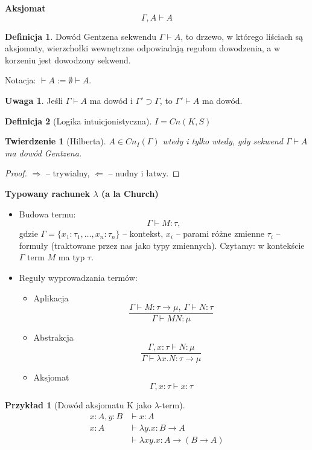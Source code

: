 \documentclass[10pt,a4paper]{article}
\theoremstyle{plain}
\newtheorem{theorem}{Twierdzenie}
\theoremstyle{definition}
\newtheorem*{definition}{Definicja}
\newtheorem*{example}{Przykład}
\newtheorem*{remark}{Uwaga}
\newcommand{\impl}{\rightarrow}
\newcommand{\header}[1]{\noindent\textbf{#1}}
\begin{document}
\header{Aksjomat}
$$\Gamma, A \vdash A$$

\begin{definition}
Dowód Gentzena sekwendu $\Gamma \vdash A$, to drzewo, w którego liściach są
aksjomaty, wierzchołki wewnętrzne odpowiadają regułom dowodzenia, a w korzeniu
jest dowodzony sekwend.
\end{definition}

\noindent Notacja: $\vdash A := \emptyset \vdash A$.

\begin{remark}
Jeśli $\Gamma \vdash A$ ma dowód i $\Gamma' \supset \Gamma$, to
$\Gamma' \vdash A$ ma dowód.
\end{remark}


\begin{definition}[Logika intuicjonistyczna]
$I = Cn(K, S)$
\end{definition}

\begin{theorem}[Hilberta]
$A \in Cn_I(\Gamma)$ wtedy i tylko wtedy, gdy sekwend $\Gamma \vdash A$ ma
dowód Gentzena.
\end{theorem}

\begin{proof}
$\Rightarrow$ -- trywialny, $\Leftarrow$ -- nudny i łatwy.
\end{proof}

\header{Typowany rachunek $\lambda$ (a la Church)}
\begin{itemize}
  \item Budowa termu:
    $$\Gamma \vdash M:\tau,$$
    gdzie $\Gamma = \{x_1:\tau_1, \ldots, x_n:\tau_n\}$ -- kontekst,
    $x_i$ -- parami różne zmienne
    $\tau_i$ -- formuły (traktowane przez nas jako typy zmiennych).
    Czytamy: w kontekście $\Gamma$ term $M$ ma typ $\tau$.
  \item Reguły wyprowadzania termów:
    \begin{itemize}
      \item Aplikacja
        $$\frac{
          \Gamma \vdash M : \tau \impl \mu, \ \Gamma \vdash N : \tau
        }{
          \Gamma \vdash MN : \mu
        }$$
      \item Abstrakcja
        $$\frac{
          \Gamma, x:\tau \vdash N : \mu
        }{
          \Gamma \vdash \lambda x . N : \tau \impl \mu
        }$$
      \item Aksjomat
        $$\Gamma, x:\tau \vdash x:\tau$$
    \end{itemize}
\end{itemize}

\begin{example}[Dowód aksjomatu K jako $\lambda$-term]
\begin{align*}
x:A, y:B &\vdash x:A \\
x:A &\vdash \lambda y . x : B \impl A \\
&\vdash \lambda xy . x : A \impl (B \impl A)
\end{align*}
\end{example}

\end{document}
